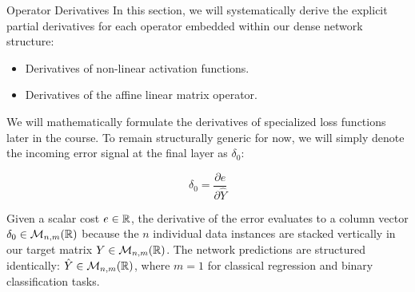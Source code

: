 \begin{frame}{Operator Derivatives}
	In this section, we will systematically derive the explicit partial derivatives for each operator embedded within our dense network structure:
	
	\begin{itemize}
		\item Derivatives of non-linear activation functions.
		\item Derivatives of the affine linear matrix operator.
	\end{itemize}
	
	\vspace{0.3cm}
	\pause
	
	We will mathematically formulate the derivatives of specialized loss functions later in the course. To remain structurally generic for now, we will simply denote the incoming error signal at the final layer as $\delta_0$:
	
	\begin{equation*}
		\delta_0 = \frac{\partial{e}}{\partial{\hat{Y}}}
	\end{equation*}
	
	\vspace{0.3cm}
	\pause
	
	Given a scalar cost $e \in \mathbb{R}$, the derivative of the error evaluates to a column vector $\delta_0 \in \mathcal{M}_{n,m}(\mathbb{R})$ because the $n$ individual data instances are stacked vertically in our target matrix $Y \in \mathcal{M}_{n,m}(\mathbb{R})$. The network predictions are structured identically: $\hat{Y} \in \mathcal{M}_{n,m}(\mathbb{R})$, where $m=1$ for classical regression and binary classification tasks.
\end{frame}

